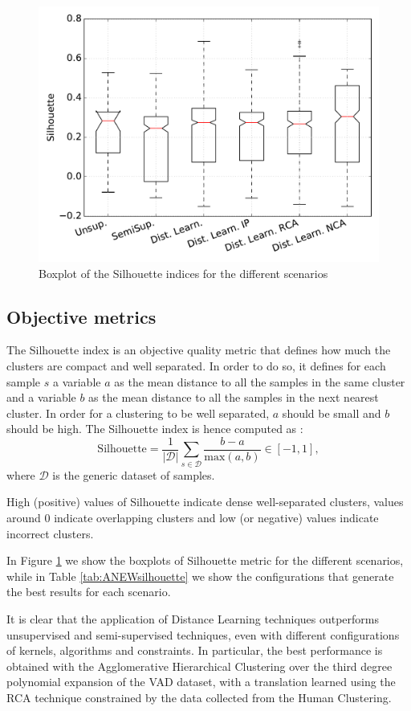 \begin{figure}[tbph]
	\centering 
	\includegraphics[width=0.75\columnwidth]{img/ANEW/Silhouette2.pdf}
	\caption{Boxplot of the Silhouette indices for the different scenarios}
	\label{fig:ANEWsilhouette}
\end{figure}	


\subsection{Objective metrics} \label{sec:ANEW:obj_results}
The Silhouette index is an objective quality metric that defines how much the clusters are compact and well separated. In order to do so, it defines for each sample $s$ a variable $a$ as the mean distance to all the samples in the same cluster and a variable $b$ as the mean distance to all the samples in the next nearest cluster. In order for a clustering to be well separated, $a$ should be small and $b$ should be high. The Silhouette index is hence computed as \cite{scikit-learn}:
\begin{equation}
\text{Silhouette}=\frac{1}{|\mathcal{D}|} \sum_{s \in \mathcal{D}} \frac{b-a}{\text{max}(a,b)}\in [-1,1],
\end{equation}
where $\mathcal{D}$ is the generic dataset of samples. 

High (positive) values of Silhouette indicate dense well-separated clusters, values around $0$ indicate overlapping clusters and low (or negative) values indicate incorrect clusters. 

In Figure \ref{fig:ANEWsilhouette} we show the boxplots of Silhouette metric for the different scenarios, while in Table \ref{tab:ANEWsilhouette} we show the configurations that generate the best results for each scenario. 

It is clear that the application of Distance Learning techniques outperforms unsupervised and semi-supervised techniques, even with different configurations of kernels, algorithms and constraints. In particular, the best performance is obtained with the Agglomerative Hierarchical Clustering over the third degree polynomial expansion of the VAD dataset, with a translation learned using the RCA technique constrained by the data collected from the Human Clustering. 

